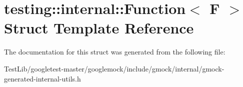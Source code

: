 \hypertarget{structtesting_1_1internal_1_1Function}{}\section{testing\+:\+:internal\+:\+:Function$<$ F $>$ Struct Template Reference}
\label{structtesting_1_1internal_1_1Function}


The documentation for this struct was generated from the following file\+:\begin{DoxyCompactItemize}
\item 
Test\+Lib/googletest-\/master/googlemock/include/gmock/internal/gmock-\/generated-\/internal-\/utils.\+h\end{DoxyCompactItemize}
